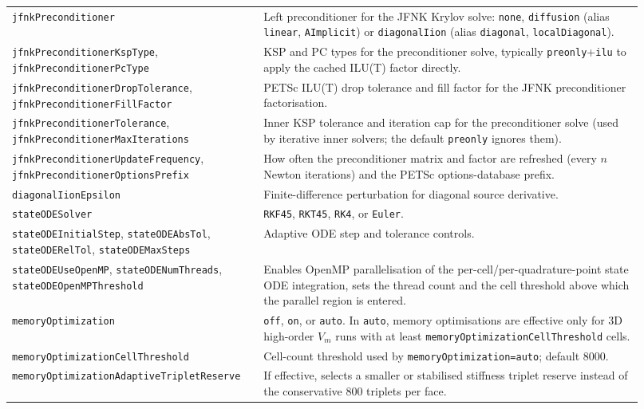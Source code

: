 \documentclass[11pt,a4paper]{article}
\newcommand{\code}[1]{\texttt{\small #1}}
\newcommand{\Vm}{V_m}
\begin{document}
\begin{longtable}{@{}p{0.34\linewidth}p{0.58\linewidth}@{}}
\code{jfnkPreconditioner} & Left preconditioner for the JFNK Krylov solve: \code{none}, \code{diffusion} (alias \code{linear}, \code{AImplicit}) or \code{diagonalIion} (alias \code{diagonal}, \code{localDiagonal}). \\
\code{jfnkPreconditionerKspType}, \code{jfnkPreconditionerPcType} & KSP and PC types for the preconditioner solve, typically \code{preonly}+\code{ilu} to apply the cached ILU(T) factor directly. \\
\code{jfnkPreconditionerDropTolerance}, \code{jfnkPreconditionerFillFactor} & PETSc ILU(T) drop tolerance and fill factor for the JFNK preconditioner factorisation. \\
\code{jfnkPreconditionerTolerance}, \code{jfnkPreconditionerMaxIterations} & Inner KSP tolerance and iteration cap for the preconditioner solve (used by iterative inner solvers; the default \code{preonly} ignores them). \\
\code{jfnkPreconditionerUpdateFrequency}, \code{jfnkPreconditionerOptionsPrefix} & How often the preconditioner matrix and factor are refreshed (every $n$ Newton iterations) and the PETSc options-database prefix. \\
\code{diagonalIionEpsilon} & Finite-difference perturbation for diagonal source derivative. \\
\code{stateODESolver} & \code{RKF45}, \code{RKT45}, \code{RK4}, or \code{Euler}. \\
\code{stateODEInitialStep}, \code{stateODEAbsTol}, \code{stateODERelTol}, \code{stateODEMaxSteps} & Adaptive ODE step and tolerance controls. \\
\code{stateODEUseOpenMP}, \code{stateODENumThreads}, \code{stateODEOpenMPThreshold} & Enables OpenMP parallelisation of the per-cell/per-quadrature-point state ODE integration, sets the thread count and the cell threshold above which the parallel region is entered. \\
\code{memoryOptimization} & \code{off}, \code{on}, or \code{auto}. In \code{auto}, memory optimisations are effective only for 3D high-order $\Vm$ runs with at least \code{memoryOptimizationCellThreshold} cells. \\
\code{memoryOptimizationCellThreshold} & Cell-count threshold used by \code{memoryOptimization=auto}; default 8000. \\
\code{memoryOptimizationAdaptiveTripletReserve} & If effective, selects a smaller or stabilised stiffness triplet reserve instead of the conservative 800 triplets per face. \\

\end{longtable}
\end{document}
